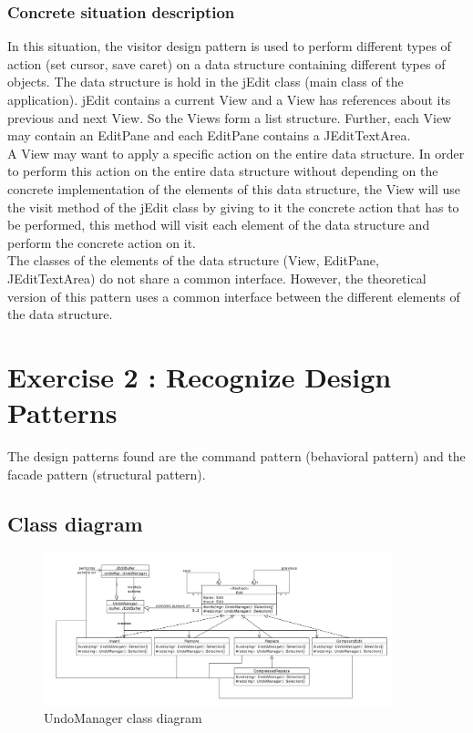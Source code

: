 \documentclass[a4paper,10pt]{article}
\begin{document}
\subsubsection{Concrete situation description}
In this situation, the visitor design pattern is used to perform different types of action (set cursor, save caret) on a data structure containing different types of objects. The data structure is hold in the jEdit class (main class of the application). jEdit contains a current View and a View has references about its previous and next View. So the Views form a list structure. Further, each View may contain an EditPane and each EditPane contains a JEditTextArea.\\
A View may want to apply a specific action on the entire data structure. In order to perform this action on the entire data structure without depending on the concrete implementation of the elements of this data structure, the View will use the visit method of the jEdit class by giving to it the concrete action that has to be performed, this method will visit each element of the data structure and perform the concrete action on it.\\
The classes of the elements of the data structure (View, EditPane, JEditTextArea) do not share a common interface. However, the theoretical version of this pattern uses a common interface between the different elements of the data structure.


\section{Exercise 2 : Recognize Design Patterns}
The design patterns found are the command pattern (behavioral pattern) and the facade pattern (structural pattern).

\subsection{Class diagram}
\begin{center}
\begin{figure}[h]
  \centerline{\includegraphics[width=0.9\textwidth]{undomanager-class-diagram.pdf}}
  \caption{UndoManager class diagram}
\end{figure}
\end{center}
\end{document}
